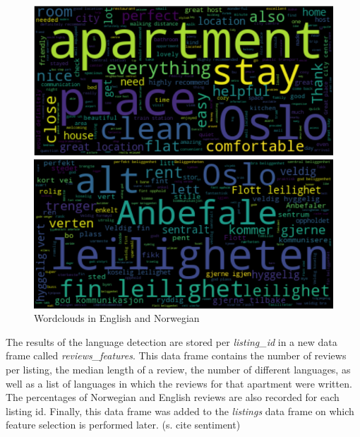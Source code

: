 \documentclass[12pt, letterpaper]{article}
\begin{document}
\begin{figure}[t]
    \centering
    \begin{minipage}{6.7cm}
        \includegraphics[width=\columnwidth]{wordcloud_eng.png}
    \end{minipage}
    \begin{minipage}{6.7cm}
        \includegraphics[width=\columnwidth]{wordcloud_nor.png}
    \end{minipage}
    \caption{Wordclouds in English and Norwegian}
    \label{fig:wordclouds}
\end{figure}

The results of the language detection are stored per \textit{listing\_id} in a new data frame called \textit{reviews\_features}.
This data frame contains the number of reviews per listing, the median length of a review, the number of different languages,
as well as a list of languages in which the reviews for that apartment were written. The percentages of Norwegian and English reviews are
also recorded for each listing id. Finally, this data frame was added to the \textit{listings} data frame on which feature selection
is performed later. (s. cite sentiment)
\end{document}
